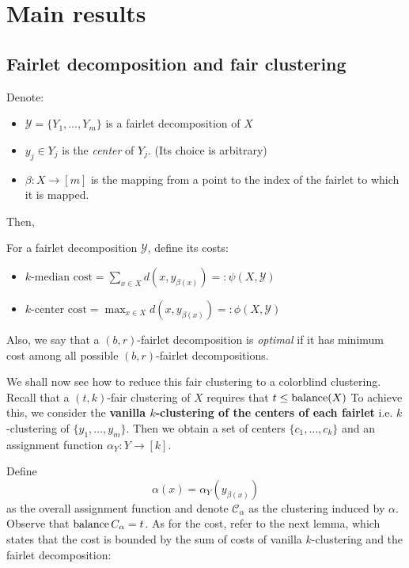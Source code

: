 \chapter{Main results}

\section{Fairlet decomposition and fair clustering}

Denote:
\begin{itemize}
	\item $\mathcal{Y} = \{ Y_1, \dots, Y_m \}$ is a fairlet decomposition of $X$
	\item $y_j \in Y_j$ is the {\it center} of $Y_j$. (Its choice is arbitrary)
	\item $\beta : X \rightarrow [m]$ is the mapping from a point to the index of the fairlet to which it is mapped.
\end{itemize}

\noindent Then,
\begin{definition}
For a fairlet decomposition $\mathcal{Y}$, define its costs:

\begin{itemize}
	\item $k \text{-median cost} = \sum_{x \in X} d \left(x, y_{\beta(x)}\right) =: \psi(X, \mathcal{Y})$
	\item $k \text{-center cost} = \max_{x \in X} d \left(x, y_{\beta(x)}\right) =: \phi(X, \mathcal{Y})$
\end{itemize}

\noindent Also, we say that a $(b, r)$-fairlet decomposition is {\it optimal} if it has minimum cost among all possible $(b, r)$-fairlet decompositions.
\end{definition}

We shall now see how to reduce this fair clustering to a colorblind clustering.
Recall that a $(t, k)$-fair clustering of $X$ requires that $t \leq \operatorname{balance}(X)$ 
To achieve this, we consider the {\bf vanilla $k$-clustering of the centers of each fairlet} i.e. $k$-clustering of $\{y_1, \dots, y_m\}$.
Then we obtain a set of centers $\{c_1, \dots, c_k\}$ and an assignment function $\alpha_Y : Y \rightarrow [k]$.

Define 
$$\alpha(x) = \alpha_Y(y_{\beta(x)})$$
as the overall assignment function and denote $\mathcal{C}_\alpha$ as the clustering induced by $\alpha$.
Observe that $\operatorname{balance}{C_\alpha} = t$.
As for the cost, refer to the next lemma, which states that the cost is bounded by the sum of costs of vanilla $k$-clustering and the fairlet decomposition:

